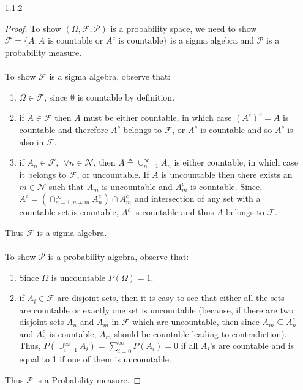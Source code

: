\documentclass[a4paper,english,10pt]{article}
\begin{document}
\begin{enumerate}
\item[1.1.2 ]
\begin{proof}
To show $(\Omega, \mathcal{F}, \mathcal{P})$ is a probability space, we need to show $\mathcal{F} = \lbrace{A: A \text{ is countable or } A^c \text{ is countable}\rbrace}$ is a sigma algebra and $\mathcal{P}$ is a probability measure.\\\\
To show $\mathcal{F}$ is a sigma algebra, observe that:
\begin{enumerate}
\item
$\Omega \in \mathcal{F}$, since $\emptyset$ is countable by definition.
\item
if $A\in \mathcal{F}$ then $A$ must be either countable, in which case $(A^c)^c = A$ is countable and therefore $A^c$ belongs to $\mathcal{F}$, or $A^c$ is countable and so $A^c$ is also in $\mathcal{F}$.
\item
if $A_n \in \mathcal{F}, ~~\forall n \in \mathcal{N}$, then $A \triangleq \cup_{n=1}^\infty A_n$ is either countable, in which case it belongs to $\mathcal{F}$, or uncountable. If $A$ is uncountable then there exists an $m\in \mathcal{N}$ such that $A_m$ is uncountable and $A_m^c$ is countable. Since,  $A^c = (\cap_{n=1,n\neq m}^\infty A_n^c) \cap A_m^c$ and intersection of any set with a countable set is countable, $A^c$ is countable and thus $A$ belongs to $\mathcal{F}$.
\end{enumerate}
Thus $\mathcal{F}$ is a sigma algebra.\\\\
To show $\mathcal{P}$ is a probability algebra, observe that:
\begin{enumerate}
\item
Since $\Omega$ is uncountable $P(\Omega) = 1$.
\item
if $A_i \in \mathcal{F}$ are disjoint sets, then it is easy to see that either all the sets are countable or exactly one set is uncountable (because, if there are two disjoint sets $A_n$ and $A_m$ in $\mathcal{F}$ which are uncountable, then since $A_m \subseteq A_n^c$ and $A_n^c$ is countable, $A_m$ should be countable leading to contradiction). Thus, $P(\cup_{i=1}^\infty A_i) = \sum_{i=0}^{\infty} P(A_i) = 0$ if all $A_i$'s are countable and is equal to 1 if one of them is uncountable.
\end{enumerate}
Thus $\mathcal{P}$ is a Probability measure. 
\end{proof}


\end{enumerate}
\end{document}
